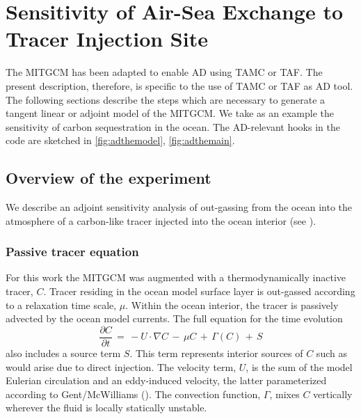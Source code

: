 
\section{Sensitivity of Air-Sea Exchange to Tracer Injection Site }
\label{sect:eg-simple-tracer-adjoint}
\label{sec_ad_setup_ex}

The MITGCM has been adapted to enable AD using TAMC or TAF.
The present description, therefore, is specific to the
use of TAMC or TAF as AD tool.
The following sections describe the steps which are necessary to 
generate a tangent linear or adjoint model of the MITGCM.
We take as an example the sensitivity of carbon sequestration
in the ocean.
The AD-relevant hooks in the code are sketched in 
\ref{fig:adthemodel}, \ref{fig:adthemain}.

\subsection{Overview of the experiment}

We describe an adjoint sensitivity analysis of out-gassing from 
the ocean into the atmosphere of a carbon-like tracer injected
into the ocean interior (see \cite{hil-eta:01}).

\subsubsection{Passive tracer equation}

For this work the MITGCM was augmented with a thermodynamically 
inactive tracer, $C$. Tracer residing in the ocean 
model surface layer is out-gassed according to a relaxation time scale, 
$\mu$. Within the ocean interior, the tracer is passively advected 
by the ocean model currents. The full equation for the time evolution
%
\begin{equation}
\label{carbon_ddt}
\frac{\partial C}{\partial t} \, = \, 
-U\cdot \nabla C \, - \, \mu C \, + \, \Gamma(C) \,+ \, S
\end{equation}
%
also includes a source term $S$. This term 
represents interior sources of $C$ such as would arise due to
direct injection.
The velocity term, $U$, is the sum of the
model Eulerian circulation and an eddy-induced velocity, the latter
parameterized according to Gent/McWilliams 
(\cite{gen-mcw:90, gen-eta:95}).
The convection function, $\Gamma$, mixes $C$ vertically wherever the 
fluid is locally statically unstable. 

